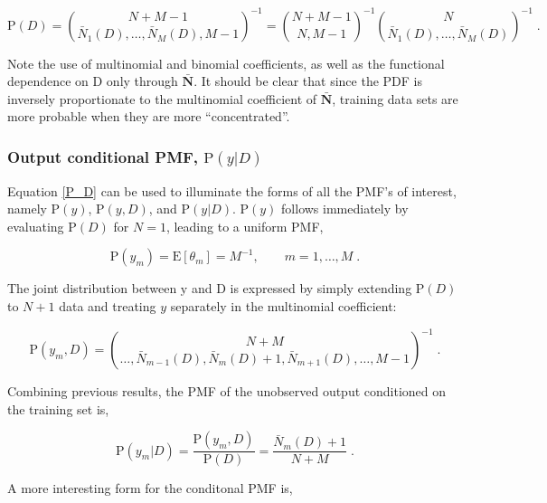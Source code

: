\documentclass[12pt]{article}
\begin{document}
\begin{equation} \label{P_D}
\text{P}(D) = \binom{N+M-1}{\bar{N}_1(D),\ldots,\bar{N}_M(D),M-1}^{-1} 
= \binom{N+M-1}{N,M-1}^{-1} \binom{N}{\bar{N}_1(D),\ldots,\bar{N}_M(D)}^{-1} \;.
\end{equation}

Note the use of multinomial and binomial coefficients, as well as the functional dependence on $\mathrm{D}$ only through $\bar{\bm{N}}$. It should be clear that since the PDF is inversely proportionate to the multinomial coefficient of $\bar{\bm{N}}$, training data sets are more probable when they are more ``concentrated''. 





\subsubsection{Output conditional PMF, $\text{P}(y | D)$}

Equation \eqref{P_D} can be used to illuminate the forms of all the PMF's of interest, namely $\text{P}(y)$, $\text{P}(y,D)$, and $\text{P}(y | D)$.  $\text{P}(y)$ follows immediately by evaluating $\text{P}(D)$ for $N=1$, leading to a uniform PMF,

\begin{equation}
\text{P}(y_m) = \text{E}[\theta_m] = M^{-1}, \qquad m=1,\ldots,M \;.
\end{equation}

The joint distribution between $\mathrm{y}$ and $\mathrm{D}$ is expressed by simply extending $\text{P}(D)$ to $N+1$ data and treating $y$ separately in the multinomial coefficient:

\begin{equation}
\text{P}(y_m,D) = \binom{N+M}{\ldots,\bar{N}_{m-1}(D),\bar{N}_m(D)+1,\bar{N}_{m+1}(D),\ldots,M-1}^{-1} \;.
\end{equation}

Combining previous results, the PMF of the unobserved output conditioned on the training set is,

\begin{equation} \label{P_y_D_basic}
\text{P}(y_m | D) = \frac{\text{P}(y_m,D)}{\text{P}(D)} = \frac{\bar{N}_m(D)+1}{N+M} \;.
\end{equation}

A more interesting form for the conditonal PMF is,

\end{document}
